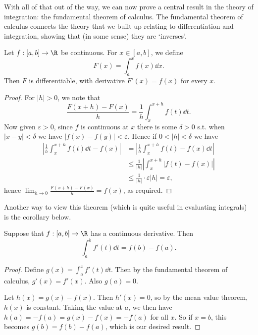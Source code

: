 With all of that out of the way, we can now prove a central result in the theory of integration: the fundamental theorem of calculus. The fundamental theorem of calculus connects the theory that we built up relating to differentiation and integration, showing that (in some sense) they are `inverses'.

\begin{theorem}
	Let $f: [a, b] \rightarrow \R $ be continuous. For $x \in [a, b]$, we define
	$$
	F(x) = \int_a^x f(x) \dd x.
	$$
	Then $F$ is differentiable, with derivative $F'(x) = f(x)$ for every $x$.
\end{theorem}
\begin{proof}
	For $|h| > 0$, we note that
	$$
	\frac{F(x + h) - F(x)}{h} = \frac{1}{h} \int_x^{x + h} f(t) \dd t.
	$$
	Now given $\varepsilon > 0$, since $f$ is continuous at $x$ there is some $\delta > 0$ s.t. when $|x - y| < \delta$ we have $|f(x) - f(y)| < \varepsilon$. Hence if $0 < |h| < \delta$ we have
	\begin{align*}
		\left|\frac{1}{h} \int_x^{x + h} f(t) \dd t - f(x)\right| &= \left|\frac{1}{h} \int_x^{x + h} f(t)  - f(x)\dd t\right| \\
		&\leq \frac{1}{|h|} \left|\int_x^{x + h} |f(t) - f(x)|\right| \\ 
		& \leq \frac{1}{|h|} \cdot \varepsilon|h| = \varepsilon,
	\end{align*}
	hence $\lim_{h \to 0}\frac{F(x + h)- F(x)}{h} = f(x)$, as required.
\end{proof}


Another way to view this theorem (which is quite useful in evaluating integrals) is the corollary below.

\begin{corollary}
	Suppose that $f: [a, b] \rightarrow \R$ has a continuous derivative. Then
	$$
	\int_a^b f'(t) \dd t = f(b) - f(a).
	$$
\end{corollary}
\begin{proof}
	Define $g(x) = \int_a^x f'(t) \dd t$. Then by the fundamental theorem of calculus, $g'(x) = f'(x)$. Also $g(a) = 0$.

	Let $h(x) = g(x) - f(x)$. Then $h'(x) = 0$, so by the mean value theorem, $h(x)$ is constant. Taking the value at $a$, we then have $h(a) = -f(a) = g(x) - f(x) = -f(a)$ for all $x$. So if $x = b$, this becomes $g(b) = f(b) - f(a)$, which is our desired result.
\end{proof}

